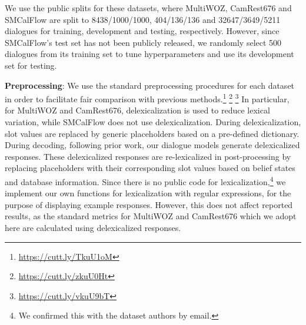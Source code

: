 \documentclass[11pt,a4paper]{article}
\begin{document}
We use the public splits for these datasets, where MultiWOZ, CamRest676 and SMCalFlow are split to 8438/1000/1000, 404/136/136 and 32647/3649/5211 dialogues for training, development and testing, respectively. However, since SMCalFlow's test set has not been publicly released, we randomly select 500 dialogues from its training set to tune hyperparameters and use its development set for testing.






\textbf{Preprocessing}: We use the standard preprocessing procedures for each dataset in order to facilitate fair comparison with previous methods.\footnote{\url{https://cutt.ly/TkuU1oM}} \footnote{\url{https://cutt.ly/zkuU0Ht}} \footnote{\url{https://cutt.ly/vkuU9bT}} In particular, for MultiWOZ and CamRest676, delexicalization is used to reduce lexical variation, while SMCalFlow does not use delexicalization. During delexicalization, slot values are replaced by generic placeholders based on a pre-defined dictionary. 
During decoding, following prior work, our dialogue models generate delexicalized responses. These delexicalized responses are re-lexicalized in post-processing by replacing placeholders with their corresponding slot values based on belief states and database information. Since there is no public code for lexicalization,\footnote{We confirmed this with the dataset authors by email.} we implement our own functions for lexicalization with regular expressions, for the purpose of displaying example responses. However, this does not affect reported results, as the standard metrics for MultiWOZ and CamRest676 which we adopt here are calculated using delexicalized responses.
\end{document}
